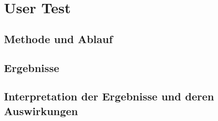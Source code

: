 \chapter{User Test}

\section{Methode und Ablauf}

\section{Ergebnisse}

\section{Interpretation der Ergebnisse und deren Auswirkungen}